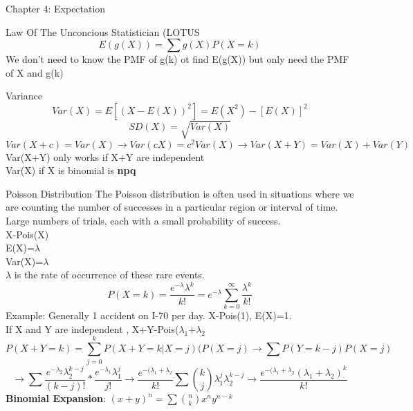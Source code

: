 \documentclass[a4paper, 12pt]{article}
\begin{document}
\begin{section}{Chapter 4: Expectation}
\begin{subsection}{Law Of The Unconcious Statistician (LOTUS}
\begin{equation} 
E(g(X))=\sum g(X)P(X=k)
\end{equation}
We don't need to know the PMF of g(k) ot find E(g(X)) but only need the PMF of X and g(k)
\end{subsection}
\begin{subsection}{Variance}
\begin{equation} 
Var(X)=E[(X-E(X))^{2}]=E(X^{2})-[E(X)]^{2} 
\end{equation}
\begin{equation} 
SD(X)=\sqrt{Var(X)}
\end{equation}
\begin{equation} 
	Var(X+c)=Var(X)\to Var(cX)=c^{2}Var(X)\to Var(X+Y)=Var(X)+Var(Y)
\end{equation}
Var(X+Y) only works if X+Y are independent\\
Var(X) if X is binomial is \textbf{npq}
\end{subsection}
\begin{subsection}{Poisson Distribution}
The Poisson distribution is often used in situations where we are counting the number of successes in a particular region or interval of time.\\
Large numbers of trials, each with a small probability of success.\\
X-Pois(X)\\
E(X)=$\lambda$\\
Var(X)=$\lambda$\\
$\lambda$ is the rate of occurrence of these rare events.\\
\begin{equation} 
P(X=k)=\frac{e^{-\lambda}\lambda^{k}}{k!}=e^{-\lambda}\sum_{k=0}^{\infty}\frac{\lambda^{k}}{k!}
\end{equation}
Example: Generally 1 accident on I-70 per day. X-Pois(1), 
E(X)=1.\\
If X and Y are independent , X+Y-Pois($\lambda_1$+$\lambda_2$\\
\begin{equation} 
P(X+Y=k)=\sum_{j=0}^{k}P(X+Y=k|X=j)(P(X=j)\to\sum P(Y=k-j)P(X=j)
\end{equation}
\begin{equation} 
\to\sum\frac{e^{-\lambda_2}\lambda_2^{k-j}}{(k-j)!}*\frac{e^{-\lambda_1}\lambda_1^{j}}{j!}\to\frac{e^{-(\lambda_1+\lambda_2}}{k!}\sum{k \choose j}\lambda_1^{j}\lambda_2^{k-j}\to\frac{e^{-(\lambda_1+\lambda_2}(\lambda_1+\lambda_2)^{k}}{k!}
\end{equation}
\textbf{Binomial Expansion}: $(x+y)^{n}=\sum{n \choose k}x^{n}y^{n-k}$\\

\end{subsection}
\end{section}
\end{document}
